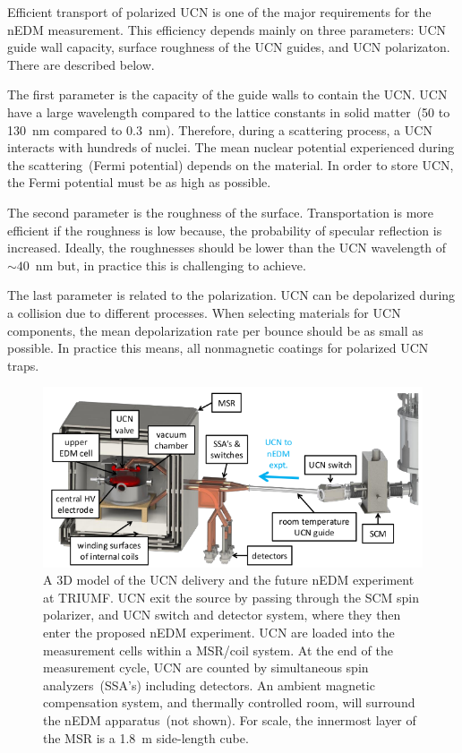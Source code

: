 Efficient transport of polarized UCN is one of the major requirements
for the nEDM measurement. This efficiency depends mainly on three
parameters: UCN guide wall capacity, surface roughness of the UCN
guides, and UCN polarizaton. There are described below.

The first parameter is the capacity of the guide walls to contain the
UCN. UCN have a large wavelength compared to the lattice constants in
solid matter~(50 to 130~nm compared to 0.3~nm). Therefore, during a
scattering process, a UCN interacts with hundreds of nuclei. The mean
nuclear potential experienced during the scattering~(Fermi potential)
depends on the material. In order to store UCN, the Fermi potential
must be as high as possible.

The second parameter is the roughness of the surface. Transportation
is more efficient if the roughness is low because, the probability of
specular reflection is increased. Ideally, the roughnesses should be
lower than the UCN wavelength of~$\sim 40$~nm but, in practice this is
challenging to achieve.

The last parameter is related to the polarization. UCN can be
depolarized during a collision due to different processes.
When selecting materials for UCN components, the mean depolarization
rate per bounce should be as small as possible. In practice this
means, all nonmagnetic coatings for polarized UCN traps.
\begin{figure}[h!]
  \centering
  \includegraphics[width=1.0\textwidth]{UCNdelivery.png}
  \caption[3D model of TUCAN's future UCN delivery for the nEDM
  measurement]{A 3D model of the UCN delivery and the future nEDM
    experiment at TRIUMF. UCN exit the source by passing through the
    SCM spin polarizer, and UCN switch and detector system, where they
    then enter the proposed nEDM experiment. UCN are loaded into the
    measurement cells within a MSR/coil system. At the end of the
    measurement cycle, UCN are counted by simultaneous spin
    analyzers~(SSA’s) including detectors. An ambient magnetic
    compensation system, and thermally controlled room, will surround
    the nEDM apparatus~(not shown). For scale, the innermost layer of
    the MSR is a 1.8~m side-length cube.}
  \label{fig:UCNdelivery}
\end{figure}



